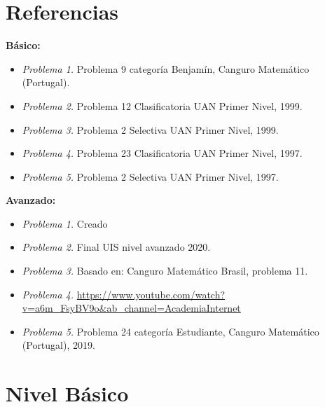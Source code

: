 \newpage
\section*{Referencias}
\textbf{Básico: }
\begin{itemize}
	\item \textit{Problema 1.} Problema 9 categoría Benjamín, Canguro Matemático (Portugal).
	\item \textit{Problema 2.} Problema 12 Clasificatoria UAN Primer Nivel, 1999.
	\item \textit{Problema 3.} Problema 2 Selectiva UAN Primer Nivel, 1999.
	\item \textit{Problema 4.} Problema 23 Clasificatoria UAN Primer Nivel, 1997.
	\item \textit{Problema 5.} Problema 2 Selectiva UAN Primer Nivel, 1997.
\end{itemize}

\textbf{Avanzado: }
\begin{itemize}
	\item \textit{Problema 1.} Creado
	\item	\textit{Problema 2.} Final UIS nivel avanzado 2020.
	\item	\textit{Problema 3.} Basado en: Canguro Matemático Brasil, problema 11.
	\item	\textit{Problema 4.} \url{https://www.youtube.com/watch?v=a6m_FsyBV9o&ab_channel=AcademiaInternet}
	\item	\textit{Problema 5.} Problema 24 categoría Estudiante, Canguro Matemático (Portugal), 2019.
\end{itemize}


\newpage
\section{Nivel Básico}\label{basico:2020_12_septiembre}

\begin{center}
\end{center}

